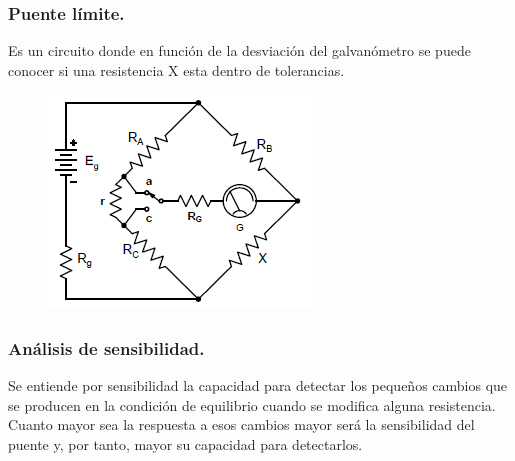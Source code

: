 \subsubsection{Puente límite.}
Es un circuito donde en función de la desviación del galvanómetro se puede conocer si una resistencia X esta dentro de tolerancias.
\begin{figure}[H]
	\centering
	\includegraphics[width=0.35\linewidth]{ImagenesTema4/16}
	\label{fig:16}
\end{figure}


\subsubsection{Análisis de sensibilidad.}
Se entiende por sensibilidad la capacidad
para detectar los pequeños
cambios que se producen en
la condición de equilibrio
cuando se modifica alguna resistencia. Cuanto mayor sea la respuesta a esos cambios mayor
será la sensibilidad del puente y, por tanto, mayor su
capacidad para detectarlos.

